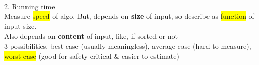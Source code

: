 \color{ForestGreen}
~\\2. Running time
\\ Measure \colorbox{Yellow}{speed} of algo. But, depends on \textbf{size} of input, so describe as \colorbox{Yellow}{function} of input size.
\\ Also depends on \textbf{content} of input, like, if sorted or not
\\ 3 possibilities, best case (usually meaningless), average case (hard to measure), \colorbox{Yellow}{worst case} (good for safety critical \& easier to estimate)